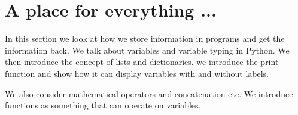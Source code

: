 \section{A place for everything ...} \label{sec:Variables}

In this section we look at how we store information in programs and get the information back. We talk about variables and variable typing in Python. We then introduce the concept of lists and dictionaries. we introduce the print function and show how it can display variables with and without labels.


We also consider mathematical operators and concatenation etc. We introduce functions as something that can operate on variables.
